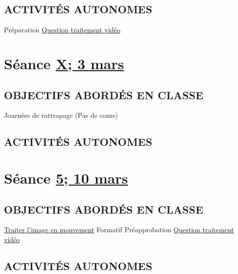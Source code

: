 \documentclass[
]{book}
\begin{document}
\hypertarget{activituxe9s-autonomes-3}{%
\subsection{ACTIVITÉS AUTONOMES}\label{activituxe9s-autonomes-3}}

Préparation \protect\hyperlink{sommatif_2}{Question traitement vidéo}

\hypertarget{semaine_5}{%
\section{\texorpdfstring{Séance \protect\hyperlink{semaine_5}{X; 3 mars}}{Séance X; 3 mars}}\label{semaine_5}}

\hypertarget{objectifs-aborduxe9s-en-classe-4}{%
\subsection{OBJECTIFS ABORDÉS EN CLASSE}\label{objectifs-aborduxe9s-en-classe-4}}

Journées de rattrapage (Pas de cours)

\hypertarget{activituxe9s-autonomes-4}{%
\subsection{ACTIVITÉS AUTONOMES}\label{activituxe9s-autonomes-4}}

\hypertarget{semaine_6}{%
\section{\texorpdfstring{Séance \protect\hyperlink{semaine_6}{5; 10 mars}}{Séance 5; 10 mars}}\label{semaine_6}}

\hypertarget{objectifs-aborduxe9s-en-classe-5}{%
\subsection{OBJECTIFS ABORDÉS EN CLASSE}\label{objectifs-aborduxe9s-en-classe-5}}

\protect\hyperlink{traiter}{Traiter l'image en mouvement}
Formatif Préapprobation \protect\hyperlink{sommatif_2}{Question traitement vidéo}

\hypertarget{activituxe9s-autonomes-5}{%
\subsection{ACTIVITÉS AUTONOMES}\label{activituxe9s-autonomes-5}}
\end{document}
